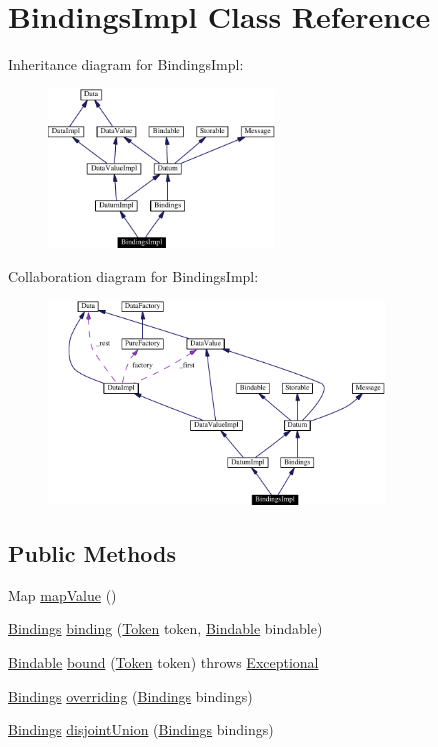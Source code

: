 \hypertarget{classBindingsImpl}{
\section{Bindings\-Impl  Class Reference}
\label{classBindingsImpl}
}
Inheritance diagram for Bindings\-Impl:\begin{figure}[H]
\begin{center}
\leavevmode
\includegraphics[width=170pt]{classBindingsImpl__inherit__graph}
\end{center}
\end{figure}
Collaboration diagram for Bindings\-Impl:\begin{figure}[H]
\begin{center}
\leavevmode
\includegraphics[width=253pt]{classBindingsImpl__coll__graph}
\end{center}
\end{figure}
\subsection*{Public Methods}
\begin{CompactItemize}
\item 
Map \hyperlink{classBindingsImpl_a0}{map\-Value} ()
\item 
\hyperlink{interfaceBindings}{Bindings} \hyperlink{classBindingsImpl_a1}{binding} (\hyperlink{interfaceToken}{Token} token, \hyperlink{interfaceBindable}{Bindable} bindable)
\item 
\hyperlink{interfaceBindable}{Bindable} \hyperlink{classBindingsImpl_a2}{bound} (\hyperlink{interfaceToken}{Token} token) throws \hyperlink{classExceptional}{Exceptional}
\item 
\hyperlink{interfaceBindings}{Bindings} \hyperlink{classBindingsImpl_a3}{overriding} (\hyperlink{interfaceBindings}{Bindings} bindings)
\item 
\hyperlink{interfaceBindings}{Bindings} \hyperlink{classBindingsImpl_a4}{disjoint\-Union} (\hyperlink{interfaceBindings}{Bindings} bindings)
\end{CompactItemize}
